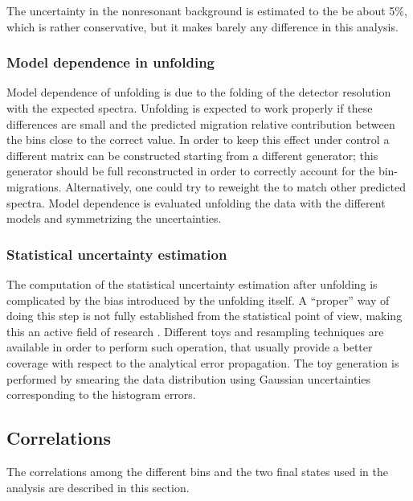 The uncertainty in the nonresonant background is estimated to the be 
about 5\%, which is rather conservative, but it makes barely any difference in
this analysis.

\subsubsection{Model dependence in unfolding}

Model dependence of unfolding is due to the folding of the detector resolution 
with the expected spectra. Unfolding is expected to work properly if these 
differences are small and the predicted migration relative contribution between 
the bins close to the correct value. In order to keep this effect under control 
a different matrix can be constructed starting from a different \MC{} generator; 
this generator should be full reconstructed in order to correctly account for 
the bin-migrations. Alternatively, one could try to reweight the \MC{} to 
match other predicted spectra. 
Model dependence is evaluated unfolding the data with the different models and 
symmetrizing the uncertainties.

\subsubsection{Statistical uncertainty estimation}

The computation of the statistical uncertainty estimation after unfolding is 
complicated by the bias introduced by the unfolding itself. A ``proper'' way 
of doing this step is not fully established from the statistical point of view, 
making this an active field of research \cite{Lyons:unfolding,kuusela}.
Different toys and resampling techniques are available in order to perform such 
operation, that usually provide a better coverage with respect to the analytical 
error propagation. The toy generation is performed by \RooUnfold{} smearing the 
data distribution using Gaussian uncertainties corresponding to the histogram 
errors.

\subsection{Correlations} 
The correlations among the different bins and the two final states used in the 
analysis are described in this section.

